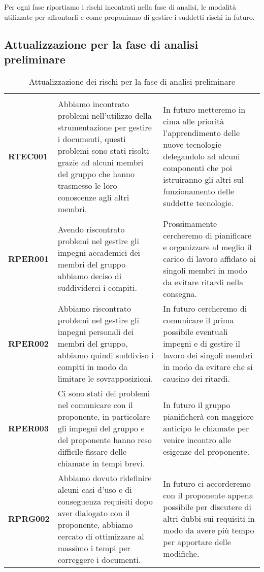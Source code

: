 \documentclass[../piano-di-progetto]{subfiles}
\begin{document}
Per ogni fase riportiamo i rischi incontrati nella fase di analisi, le modalità utilizzate per affrontarli e come proponiamo di gestire i suddetti rischi in futuro.

\subsection{Attualizzazione per la fase di analisi preliminare}%
\label{sub:attualizzazione_fase_analisi_preliminare}

\begin{longtable}[H]{|p{10em}|p{17em}|p{17em}|}
  \caption{Attualizzazione dei rischi per la fase di analisi preliminare}%
  \label{tab:attualizzazione_fase_analisi_preliminare} \\
  \rowcolor{darkgray!90!}
  \color{white}{\textbf{Rischio}} & \color{white}{\textbf{Gestione}} & \color{white}{\textbf{Monitoraggio}} \\
  \textbf{RTEC001} & Abbiamo incontrato problemi nell'utilizzo della strumentazione per gestire i documenti, questi problemi sono stati risolti grazie ad alcuni membri del gruppo che hanno trasmesso le loro conoscenze agli altri membri. & In futuro metteremo in cima alle priorità l'apprendimento delle nuove tecnologie delegandolo ad alcuni componenti che poi istruiranno gli altri sul funzionamento delle suddette tecnologie.\\
  \textbf{RPER001} & Avendo riscontrato problemi nel gestire gli impegni accademici dei membri del gruppo abbiamo deciso di suddividerci i compiti. & Prossimamente cercheremo di pianificare e organizzare al meglio il carico di lavoro affidato ai singoli membri in modo da evitare ritardi nella consegna.\\
  \textbf{RPER002} & Abbiamo riscontrato problemi nel gestire gli impegni personali dei membri del gruppo, abbiamo quindi suddiviso i compiti in modo da limitare le sovrapposizioni. & In futuro cercheremo di comunicare il prima possibile eventuali impegni e di gestire il lavoro dei singoli membri in modo da evitare che si causino dei ritardi.\\
  \textbf{RPER003} & Ci sono stati dei problemi nel comunicare con il proponente, in particolare gli impegni del gruppo e del proponente hanno reso difficile fissare delle chiamate in tempi brevi. & In futuro il gruppo pianificherà con maggiore anticipo le chiamate per venire incontro alle esigenze del proponente.\\
  \textbf{RPRG002} & Abbiamo dovuto ridefinire alcuni casi d'uso e di conseguenza requisiti dopo aver dialogato con il proponente, abbiamo cercato di ottimizzare al massimo i tempi per correggere i documenti. & In futuro ci accorderemo con il proponente appena possibile per discutere di altri dubbi sui requisiti in modo da avere più tempo per apportare delle modifiche.\\
\end{longtable}
\end{document}
